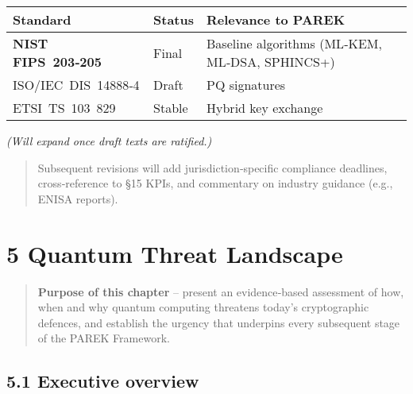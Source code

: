 \documentclass[
  english,
]{article}
\begin{document}
\begin{longtable}[]{@{}
  >{\raggedright\arraybackslash}p{}
  >{\raggedright\arraybackslash}p{}
  >{\raggedright\arraybackslash}p{}@{}}
\toprule\noalign{}
\begin{minipage}[b]{\linewidth}\raggedright
Standard
\end{minipage} & \begin{minipage}[b]{\linewidth}\raggedright
Status
\end{minipage} & \begin{minipage}[b]{\linewidth}\raggedright
Relevance to PAREK
\end{minipage} \\
\midrule\noalign{}
\endhead
\bottomrule\noalign{}
\endlastfoot
\textbf{NIST FIPS~203‑205} & Final & Baseline algorithms (ML‑KEM,
ML‑DSA, SPHINCS+) \\
ISO/IEC~DIS~14888‑4 & Draft & PQ signatures \\
ETSI~TS~103~829 & Stable & Hybrid key exchange \\
\end{longtable}

\emph{(Will expand once draft texts are ratified.)}

\begin{quote}
Subsequent revisions will add jurisdiction‑specific compliance
deadlines, cross‑reference to §15 KPIs, and commentary on industry
guidance (e.g., ENISA reports).
\end{quote}

\section{5 Quantum Threat Landscape}\label{quantum-threat-landscape}

\begin{quote}
\textbf{Purpose of this chapter} -- present an evidence‑based assessment
of how, when and why quantum computing threatens today's cryptographic
defences, and establish the urgency that underpins every subsequent
stage of the PAREK Framework.
\end{quote}

\subsection{5.1 Executive overview}\label{executive-overview}
\end{document}
